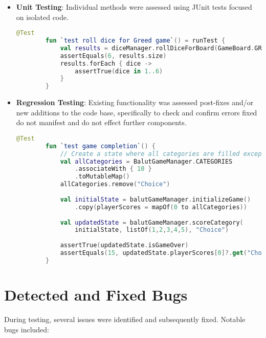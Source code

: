 \begin{itemize}
    \item \textbf{Unit Testing}: Individual methods were assessed using JUnit tests focused on isolated code.
        \begin{lstlisting}[language=Kotlin, caption=Unit Test for Dice Rolling, label=lst:unit_dice_rolling]
        @Test
        fun `test roll dice for Greed game`() = runTest {
            val results = diceManager.rollDiceForBoard(GameBoard.GREED.modeName)
            assertEquals(6, results.size)
            results.forEach { dice ->
                assertTrue(dice in 1..6)
            }
        }
    \end{lstlisting}
    \label{lst:unit_dice_rolling}
    \item \textbf{Regression Testing}: Existing functionality was assessed post-fixes and/or new additions to the code base, specifically to check and confirm errors fixed do not manifest and do not effect further components.
    \begin{lstlisting}[language=Kotlin, caption=Regression Test for Game Completion, label=lst:regression_game_completion]
        @Test
        fun `test game completion`() {
            // Create a state where all categories are filled except one
            val allCategories = BalutGameManager.CATEGORIES
                .associateWith { 10 }
                .toMutableMap()
            allCategories.remove("Choice")
            
            val initialState = balutGameManager.initializeGame()
                .copy(playerScores = mapOf(0 to allCategories))
            
            val updatedState = balutGameManager.scoreCategory(
                initialState, listOf(1,2,3,4,5), "Choice")
            
            assertTrue(updatedState.isGameOver)
            assertEquals(15, updatedState.playerScores[0]?.get("Choice"))
        }
    \end{lstlisting}
    \label{lst:regression_game_completion}
\end{itemize}

\section{Detected and Fixed Bugs}

During testing, several issues were identified and subsequently fixed.  Notable bugs included:

